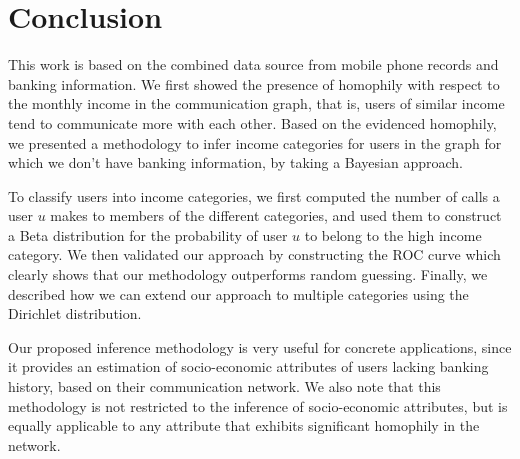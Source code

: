 \section{Conclusion}

This work is based on the combined data source
from mobile phone records and banking information.
We first showed the presence of homophily with respect to the monthly income in the
communication graph, that is, users of similar income tend to communicate more with each other. Based on the evidenced homophily, we presented a methodology to infer income categories for users in the graph for which we don't have
banking information, by taking a Bayesian approach.

To classify users into income categories, we first computed the number of calls a user $u$ makes to members of the different categories, and used them to construct a Beta distribution for the probability of user $u$ to belong to the high income category. We then validated our approach by constructing the ROC curve which clearly shows that our methodology outperforms random guessing.
Finally, we described how we can extend our approach to multiple categories using the Dirichlet distribution.

Our proposed inference methodology is very useful for concrete applications, since it provides an estimation of socio-economic attributes of users lacking banking history, based on their communication network. We also note that this methodology is not restricted to the inference of socio-economic attributes, but is equally applicable to any attribute that exhibits significant homophily in the network.

